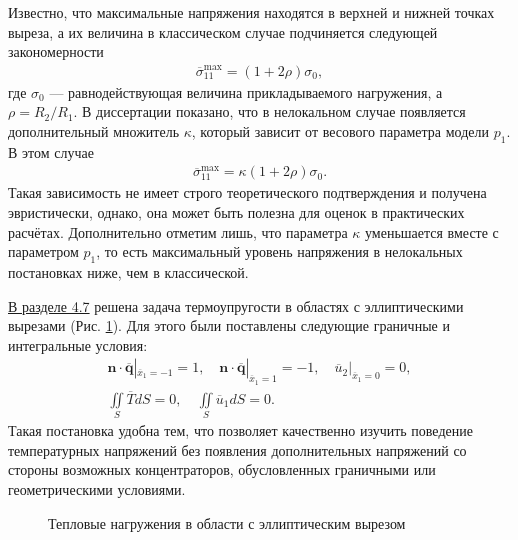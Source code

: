 Известно, что максимальные напряжения находятся в верхней и нижней точках выреза, а их величина в классическом случае подчиняется следующей закономерности
\begin{gather*}
	\overline{\sigma}_{11}^{\max} = \left( 1 + 2 \rho \right) \sigma_0,
\end{gather*}
где $\sigma_0$ --- равнодействующая величина прикладываемого нагружения, а $\rho = R_2 / R_1$. В диссертации показано, что в нелокальном случае появляется дополнительный множитель $\kappa$, который зависит от весового параметра модели $p_1$. В этом случае
 \begin{gather*}
	\overline{\sigma}_{11}^{\max} = \kappa \left( 1 + 2 \rho \right) \sigma_0.
\end{gather*}
Такая зависимость не имеет строго теоретического подтверждения и получена эвристически, однако, она может быть полезна для оценок в практических расчётах. Дополнительно отметим лишь, что параметра $\kappa$ уменьшается вместе с параметром $p_1$, то есть максимальный уровень напряжения в нелокальных постановках ниже, чем в классической.

\underline{В разделе 4.7} решена задача термоупругости в областях с эллиптическими вырезами (Рис. \ref{fig:ThermalKirshProblem}). Для этого были поставлены следующие граничные и интегральные условия:
\begin{gather*}
	\boldsymbol{n} \cdot \overline{\boldsymbol{q}}|_{\overline{x}_1 = -1} = 1,
	\quad
	\boldsymbol{n} \cdot \overline{\boldsymbol{q}}|_{\overline{x}_1 = 1} = -1,
	\quad
	\overline{u}_2 |_{\overline{x}_1 = 0} = 0,
	\\
	\iint\limits_S \overline{T} dS = 0,
	\quad
	\iint\limits_S \overline{u}_1 dS = 0.
\end{gather*}
Такая постановка удобна тем, что позволяет качественно изучить поведение температурных напряжений без появления дополнительных напряжений со стороны возможных концентраторов, обусловленных граничными или геометрическими условиями.

\begin{figure}[ht]
    \caption{Тепловые нагружения в области с эллиптическим вырезом}
    \label{fig:ThermalKirshProblem}
\end{figure}

